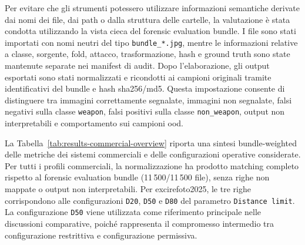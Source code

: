 Per evitare che gli strumenti potessero utilizzare informazioni semantiche
derivate dai nomi dei file, dai path o dalla struttura delle cartelle, la
valutazione è stata condotta utilizzando la vista cieca del forensic evaluation
bundle. I file sono stati importati con nomi neutri del tipo
\texttt{bundle\_*.jpg}, mentre le informazioni relative a classe, sorgente, fold,
attacco, trasformazione, hash e ground truth sono state mantenute separate nei
manifest di audit. Dopo l'elaborazione, gli output esportati sono stati
normalizzati e ricondotti ai campioni originali tramite identificativi del bundle
e hash \gls{sha256}/\gls{md5}. Questa impostazione consente di distinguere tra
immagini correttamente segnalate, immagini non segnalate, falsi negativi sulla
classe \texttt{weapon}, falsi positivi sulla classe \texttt{non\_weapon}, output
non interpretabili e comportamento sui campioni \gls{ood}.

La Tabella~\ref{tab:results-commercial-overview} riporta una sintesi bundle-weighted
delle metriche dei sistemi commerciali e delle configurazioni
operative considerate. Per tutti i profili commerciali, la normalizzazione ha
prodotto matching completo rispetto al forensic evaluation bundle
(11\,500/11\,500 file), senza righe non mappate o output non interpretabili. Per
\gls{excirefoto2025}, le tre righe corrispondono alle configurazioni
\texttt{D20}, \texttt{D50} e \texttt{D80} del parametro \texttt{Distance limit}.
La configurazione \texttt{D50} viene utilizzata come riferimento principale nelle
discussioni comparative, poiché rappresenta il compromesso intermedio tra
configurazione restrittiva e configurazione permissiva.


